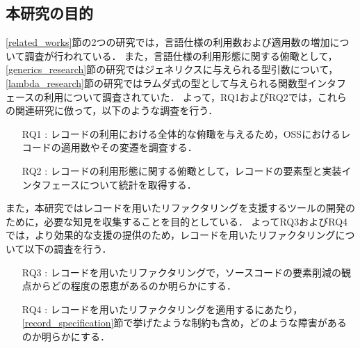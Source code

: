 \subsection{本研究の目的\label{research_goals}}
\ref{related_works}節の2つの研究では，言語仕様の利用数および適用数の増加について調査が行われている．
また，言語仕様の利用形態に関する俯瞰として，\ref{generics_research}節の研究ではジェネリクスに与えられる型引数について，\ref{lambda_research}節の研究ではラムダ式の型として与えられる関数型インタフェースの利用について調査されていた．
よって，RQ1およびRQ2では，これらの関連研究に倣って，以下のような調査を行う．
\begin{itemize}
    \item[RQ1 : ] レコードの利用における全体的な俯瞰を与えるため，OSSにおけるレコードの適用数やその変遷を調査する．
    \item[RQ2 : ] レコードの利用形態に関する俯瞰として，レコードの要素型と実装インタフェースについて統計を取得する．
\end{itemize}

また，本研究ではレコードを用いたリファクタリングを支援するツールの開発のために，必要な知見を収集することを目的としている．
よってRQ3およびRQ4では，より効果的な支援の提供のため，レコードを用いたリファクタリングについて以下の調査を行う．
\begin{itemize}
    \item[RQ3 : ] レコードを用いたリファクタリングで，ソースコードの要素削減の観点からどの程度の恩恵があるのか明らかにする．
    \item[RQ4 : ] レコードを用いたリファクタリングを適用するにあたり，\ref{record_specification}節で挙げたような制約も含め，どのような障害があるのか明らかにする．
\end{itemize}